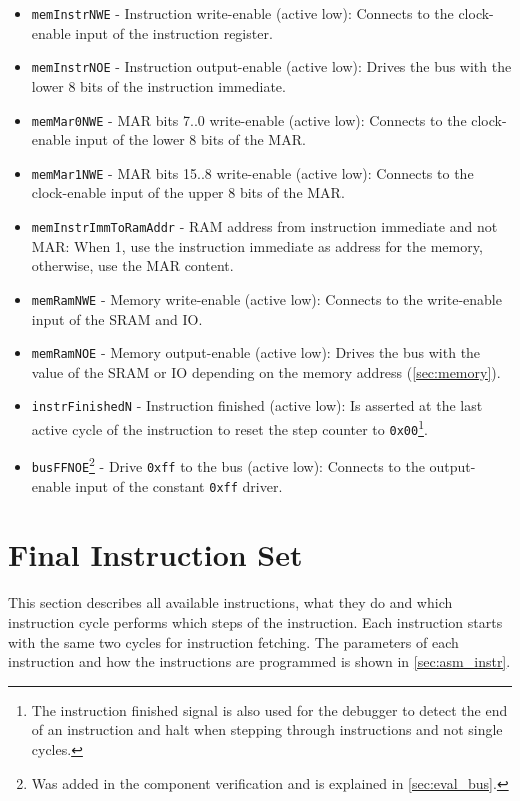 \begin{itemize}
  \item \texttt{memInstrNWE} - Instruction write-enable (active low): Connects to the clock-enable input of the instruction register.
  \item \texttt{memInstrNOE} - Instruction output-enable (active low): Drives the bus with the lower 8 bits of the instruction immediate.
  \item \texttt{memMar0NWE} - \gls{MAR} bits 7..0 write-enable (active low): Connects to the clock-enable input of the lower 8 bits of the \gls{MAR}.
  \item \texttt{memMar1NWE} - \gls{MAR} bits 15..8 write-enable (active low): Connects to the clock-enable input of the upper 8 bits of the \gls{MAR}.
  \item \texttt{memInstrImmToRamAddr} - \gls{RAM} address from instruction immediate and not \gls{MAR}: When 1, use the instruction immediate as address for the memory, otherwise, use the \gls{MAR} content.
  \item \texttt{memRamNWE} - Memory write-enable (active low): Connects to the write-enable input of the \gls{SRAM} and \gls{IO}.
  \item \texttt{memRamNOE} - Memory output-enable (active low): Drives the bus with the value of the \gls{SRAM} or \gls{IO} depending on the memory address (\cref{sec:memory}).
  \item \texttt{instrFinishedN} - Instruction finished (active low): Is asserted at the last active cycle of the instruction to reset the step counter to \texttt{0x00}\footnote{The instruction finished signal is also used for the debugger to detect the end of an instruction and halt when stepping through instructions and not single cycles.}.
  \item \texttt{busFFNOE}\footnote{Was added in the component verification and is explained in \cref{sec:eval_bus}.} - Drive \texttt{0xff} to the bus (active low): Connects to the output-enable input of the constant \texttt{0xff} driver.
\end{itemize}

\section{Final Instruction Set}\label{sec:instructionSet}
This section describes all available instructions, what they do and which instruction cycle performs which steps of the instruction.
Each instruction starts with the same two cycles for instruction fetching.
The parameters of each instruction and how the instructions are programmed is shown in \cref{sec:asm_instr}.
